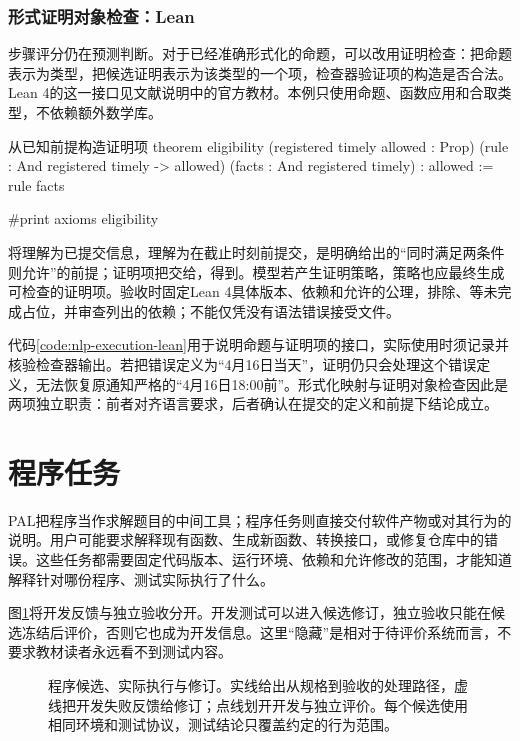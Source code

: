 \subsubsection{形式证明对象检查：Lean}
\label{sec:nlp-execution-lean}

步骤评分仍在预测判断。对于已经准确形式化的命题，可以改用证明检查：把命题表示为类型，把候选证明表示为该类型的一个项，检查器验证项的构造是否合法。Lean 4的这一接口见文献说明中的官方教材。本例只使用命题、函数应用和合取类型，不依赖额外数学库。

\begin{codeblock}[label={code:nlp-execution-lean}]{从已知前提构造证明项}
theorem eligibility
    (registered timely allowed : Prop)
    (rule : And registered timely -> allowed)
    (facts : And registered timely) : allowed :=
  rule facts

#print axioms eligibility
\end{codeblock}

将理解为已提交信息，理解为在截止时刻前提交，是明确给出的“同时满足两条件则允许”的前提；证明项把交给，得到。模型若产生证明策略，策略也应最终生成可检查的证明项。验收时固定Lean 4具体版本、依赖和允许的公理，排除、等未完成占位，并审查列出的依赖；不能仅凭没有语法错误接受文件。

代码\ref{code:nlp-execution-lean}用于说明命题与证明项的接口，实际使用时须记录并核验检查器输出。若把错误定义为“4月16日当天”，证明仍只会处理这个错误定义，无法恢复原通知严格的“4月16日18:00前”。形式化映射与证明对象检查因此是两项独立职责：前者对齐语言要求，后者确认在提交的定义和前提下结论成立。

\section{程序任务}
\label{sec:nlp-execution-programs}

PAL把程序当作求解题目的中间工具；程序任务则直接交付软件产物或对其行为的说明。用户可能要求解释现有函数、生成新函数、转换接口，或修复仓库中的错误。这些任务都需要固定代码版本、运行环境、依赖和允许修改的范围，才能知道解释针对哪份程序、测试实际执行了什么。

图\ref{fig:nlp-execution-program-loop}将开发反馈与独立验收分开。开发测试可以进入候选修订，独立验收只能在候选冻结后评价，否则它也成为开发信息。这里“隐藏”是相对于待评价系统而言，不要求教材读者永远看不到测试内容。

\begin{figure}[htbp]
  \centering
  
  \caption{程序候选、实际执行与修订。实线给出从规格到验收的处理路径，虚线把开发失败反馈给修订；点线划开开发与独立评价。每个候选使用相同环境和测试协议，测试结论只覆盖约定的行为范围。}
  \label{fig:nlp-execution-program-loop}
\end{figure}
\FloatBarrier

